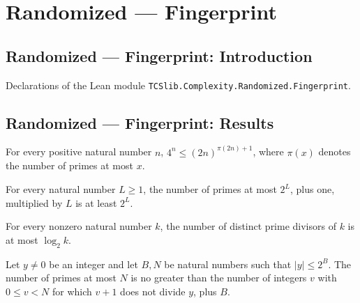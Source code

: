 \section{Randomized --- Fingerprint}
\subsection*{Randomized --- Fingerprint: Introduction}

Declarations of the Lean module \texttt{TCSlib.Complexity.Randomized.Fingerprint}.

\subsection*{Randomized --- Fingerprint: Results}

\begin{theorem}
\label{Randomized.four_pow_le_pow_primeCounting}
\leanok
{}
For every positive natural number $n$, $4^n\le (2n)^{\pi(2n)+1}$, where $\pi(x)$ denotes
the number of primes at most $x$.
\end{theorem}

\begin{theorem}
\label{Randomized.two_pow_le_mul_primeCounting}
\leanok
{}
For every natural number $L\ge1$, the number of primes at most $2^L$, plus one,
multiplied by $L$ is at least $2^L$.
\end{theorem}

\begin{theorem}
\label{Randomized.two_pow_card_primeFactors_le}
\leanok
{}
For every nonzero natural number $k$, the number of distinct prime divisors of $k$ is at
most $\log_2 k$.
\end{theorem}

\begin{theorem}
\label{Randomized.primeCounting_le_card_not_dvd}
\leanok
{}
Let $y\ne0$ be an integer and let $B,N$ be natural numbers such that $|y|\le2^B$. The
number of primes at most $N$ is no greater than the number of integers $v$ with $0\le
v<N$ for which $v+1$ does not divide $y$, plus $B$.
\end{theorem}

